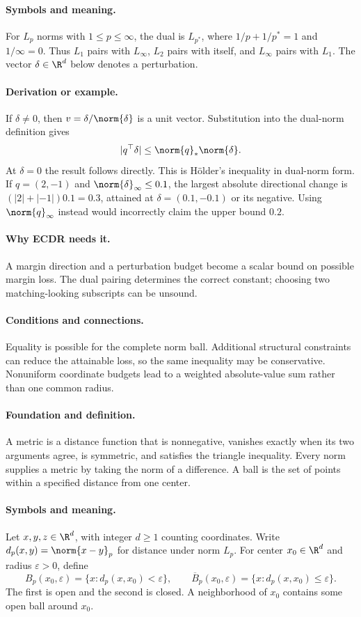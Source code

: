 \paragraph{Symbols and meaning.}
For $L_p$ norms with $1\le p\le\infty$, the dual is $L_{p^*}$,
where $1/p+1/p^*=1$ and $1/\infty=0$. Thus $L_1$ pairs with
$L_\infty$, $L_2$ pairs with itself, and $L_\infty$ pairs with $L_1$.
The vector $\delta\in\R^d$ below denotes a perturbation.
\paragraph{Derivation or example.}
If $\delta\ne0$, then $v=\delta/\norm{\delta}$ is a unit vector.
Substitution into the dual-norm definition gives
\[
 |q^\top\delta|\le\norm{q}_*\norm{\delta}.
\]
At $\delta=0$ the result follows directly. This is H\"older's
inequality in dual-norm form. If $q=(2,-1)$ and
$\norm{\delta}_\infty\le0.1$, the largest absolute directional
change is $(|2|+|-1|)0.1=0.3$, attained at
$\delta=(0.1,-0.1)$ or its negative. Using $\norm{q}_\infty$
instead would incorrectly claim the upper bound $0.2$.
\paragraph{Why ECDR needs it.}
A margin direction and a perturbation budget become a scalar bound on
possible margin loss. The dual pairing determines the correct constant;
choosing two matching-looking subscripts can be unsound.
\paragraph{Conditions and connections.}
Equality is possible for the complete norm ball. Additional structural
constraints can reduce the attainable loss, so the same inequality may
be conservative. Nonuniform coordinate budgets lead to a weighted
absolute-value sum rather than one common radius.

\paragraph{Foundation and definition.}
A metric is a distance function that is nonnegative, vanishes exactly
when its two arguments agree, is symmetric, and satisfies the triangle
inequality. Every norm supplies a metric by taking the norm of a
difference. A ball is the set of points within a specified distance
from one center.
\paragraph{Symbols and meaning.}
Let $x,y,z\in\R^d$, with integer $d\ge1$ counting coordinates.
Write $d_p(x,y)=\norm{x-y}_p$ for distance under norm $L_p$.
For center $x_0\in\R^d$ and radius $\varepsilon>0$, define
\[
 B_p(x_0,\varepsilon)=\{x:d_p(x,x_0)<\varepsilon\},\qquad
 \overline B_p(x_0,\varepsilon)=\{x:d_p(x,x_0)\le\varepsilon\}.
\]
The first is open and the second is closed. A neighborhood of $x_0$
contains some open ball around $x_0$.
